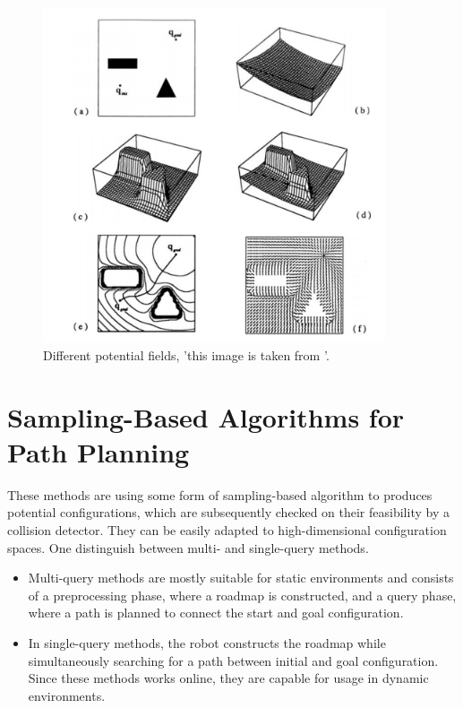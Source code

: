 \begin{figure} [h]
	\centering
	\includegraphics[width=0.9\textwidth]{images/potential_field.png}
	\caption{Different potential fields, 'this image is taken from \cite{Latombe2012}'.}
	\label{pics:potential_field}
\end{figure}

\section{Sampling-Based Algorithms for Path Planning}

These methods are using some form of sampling-based algorithm to produces potential configurations, which are subsequently checked on their feasibility by a collision detector. They can be easily adapted to high-dimensional configuration spaces. One distinguish between multi- and single-query methods. 

\begin{itemize}
	\item
	Multi-query methods are mostly suitable for static environments and consists of a preprocessing phase, where a roadmap is constructed, and a query phase, where a path is planned to connect the start and goal configuration. 
	\item
	In single-query methods, the robot constructs the roadmap while simultaneously searching for a path between initial and goal configuration. Since these methods works online, they are capable for usage in dynamic environments.
\end{itemize}


